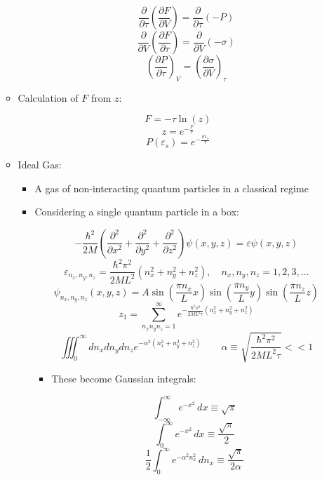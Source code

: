 \begin{itemize}
\begin{itemize}
\begin{itemize}
            $$\frac{\partial}{\partial\tau}\left( \frac{\partial F}{\partial V} \right)=\frac{\partial}{\partial \tau}(-P)$$
            $$\frac{\partial}{\partial V}\left( \frac{\partial F}{\partial \tau} \right)=\frac{\partial}{\partial V}(-\sigma)$$
            $$\left( \frac{\partial P}{\partial \tau} \right)_V=\left(\frac{\partial\sigma}{\partial V}\right)_{\tau}$$

        \end{itemize}

      \item Calculation of $F$ from $z$:

        $$F=-\tau\ln(z)$$
        $$z=e^{-\frac{F}{\tau}}$$
        $$P(\varepsilon_s)=e^{-\frac{F\varepsilon_s}{\tau}}$$

      \item Ideal Gas:

        \begin{itemize}

          \item A gas of non-interacting quantum particles in a classical regime

          \item Considering a single quantum particle in a box:

            $$-\frac{\hbar^2}{2M}\left( \frac{\partial^2}{\partial x^2}+\frac{\partial^2}{\partial y^2}+\frac{\partial^2}{\partial z^2} \right)\psi(x,y,z)=\varepsilon\psi(x,y,z)$$
            $$\varepsilon_{n_x,n_y,n_z}=\frac{\hbar^2\pi^2}{2ML^2}\left( n_x^2+n_y^2+n_z^2 \right),\quad n_x,n_y,n_z=1,2,3,\ldots$$
            $$\psi_{n_x,n_y,n_z}(x,y,z)=A\sin\left(\frac{\pi n_x}{L}x\right)\sin\left(\frac{\pi n_y}{L}y\right)\sin\left(\frac{\pi n_z}{L}z\right)$$
            $$z_1=\sum_{n_xn_yn_z=1}^{\infty}e^{-\frac{\hbar^2\pi^2}{2ML^2\tau}\left( n_x^2+n_y^2+n_z^2 \right)}$$
            $$\iiint_0^{\infty}dn_xdn_ydn_z e^{-\alpha^2(n_x^2+n_y^2+n_z^2)}\quad\quad\alpha\equiv\sqrt{\frac{\hbar^2\pi^2}{2ML^2\tau}} << 1$$

            \begin{itemize}

              \item These become Gaussian integrals:

                $$\int_{-\infty}^{\infty}e^{-x^2}\,dx\equiv\sqrt{\pi}$$
                $$\int_{0}^{\infty}e^{-x^2}\,dx\equiv\frac{\sqrt{\pi}}{2}$$
                $$\frac{1}{2}\int_{0}^{\infty}e^{-\alpha^2n_x^2}\,dn_x\equiv\frac{\sqrt{\pi}}{2\alpha}$$


\end{itemize}
\end{itemize}
\end{itemize}
\end{itemize}
